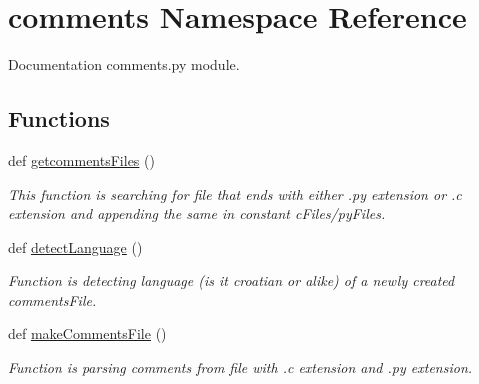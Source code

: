 \hypertarget{namespacecomments}{}\section{comments Namespace Reference}
\label{namespacecomments}


Documentation comments.\+py module.  


\subsection*{Functions}
\begin{DoxyCompactItemize}
\item 
\mbox{\label{namespacecomments_a16ebecf3adb5c573d8a7e742196b737a}} 
def \hyperlink{namespacecomments_a16ebecf3adb5c573d8a7e742196b737a}{getcomments\+Files} ()
\begin{DoxyCompactList}\small\item\em This function is searching for file that ends with either .py extension or .c extension and appending the same in constant c\+Files/py\+Files. \end{DoxyCompactList}\item 
\mbox{\label{namespacecomments_a3a4ba2b9fb5a5325c96bbf4d74266a7e}} 
def \hyperlink{namespacecomments_a3a4ba2b9fb5a5325c96bbf4d74266a7e}{detect\+Language} ()
\begin{DoxyCompactList}\small\item\em Function is detecting language (is it croatian or alike) of a newly created comments\+File. \end{DoxyCompactList}\item 
\mbox{\label{namespacecomments_a809939db084159ae5b70a9bf45d1755d}} 
def \hyperlink{namespacecomments_a809939db084159ae5b70a9bf45d1755d}{make\+Comments\+File} ()
\begin{DoxyCompactList}\small\item\em Function is parsing comments from file with .c extension and .py extension. \end{DoxyCompactList}\end{DoxyCompactItemize}
